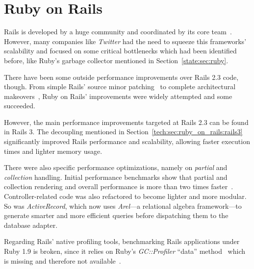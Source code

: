 \section{Ruby on Rails} %
\label{state:sec:ruby_on_rails}
Rails is developed by a huge community and coordinated by its core team~\cite{rails_core_team}. However, many companies like \textit{Twitter} had the need to squeeze this frameworks' scalability and focused on some critical bottlenecks which had been identified before, like Ruby's garbage collector mentioned in Section~\ref{state:sec:ruby}.

There have been some outside performance improvements over Rails 2.3 code, though. From simple Rails' source minor patching~\cite{accunote_rails} to complete architectural makeovers~\cite{distributed_rails}, Ruby on Rails' improvements were widely attempted and some succeeded.

However, the main performance improvements targeted at Rails 2.3 can be found in Rails 3. The decoupling mentioned in Section~\ref{tech:sec:ruby_on_rails:rails3} significantly improved Rails performance and scalability, allowing faster execution times and lighter memory usage.

There were also specific performance optimizations, namely on \textit{partial} and \textit{collection} handling. Initial performance benchmarks show that partial and collection rendering and overall performance is more than two times faster~\cite{vaporware_to_awesome,rails_merb_merge_performance}. Controller-related code was also refactored to become lighter and more modular. So was \textit{ActiveRecord}, which now uses \textit{Arel}---a relational algebra framework---to generate smarter and more efficient queries before dispatching them to the database adapter.

Regarding Rails' native profiling tools, benchmarking Rails applications under Ruby 1.9 is broken, since it relies on Ruby's \textit{GC::Profiler} ``data'' method~\cite{testing_performance_old} which is missing and therefore not available~\cite{yarv_gc_profiler}.

